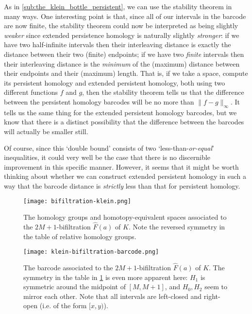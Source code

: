 \documentclass[12pt]{article}
\numberwithin{equation}{subsection}
\numberwithin{theorem}{subsection}
\numberwithin{lemma}{subsection}
\numberwithin{corollary}{subsection}
\numberwithin{definition}{subsection}
\numberwithin{example}{subsection}
\numberwithin{note}{subsection}
\begin{document}
            As in \cref{sub:the_klein_bottle_persistent}, we can use the stability theorem in many ways.
            One interesting point is that, since all of our intervals in the barcode are now finite, the stability theorem could now be interpreted as being slightly \emph{weaker} since extended persistence homology is naturally slightly \emph{stronger}: if we have two half-infinite intervals then their interleaving distance is exactly the distance between their two (finite) endpoints; if we have two \emph{finite} intervals then their interleaving distance is the \emph{minimum} of the (maximum) distance between their endpoints and their (maximum) length.
            That is, if we take a space, compute its persistent homology and extended persistent homology, both using two different functions $f$ and $g$, then the stability theorem tells us that the difference between the persistent homology barcodes will be no more than $\|f-g\|_\infty$.
            It tells us the same thing for the extended persistent homology barcodes, but we know that there is a distinct possibility that the difference between the barcodes will actually be smaller still.

            Of course, since this `double bound' consists of two `less-than-\emph{or-equal}' inequalities, it could very well be the case that there is no discernible improvement in this specific manner.
            However, it seems that it might be worth thinking about whether we can construct extended persistent homology in such a way that the barcode distance is \emph{strictly} less than that for persistent homology.

            \begin{figure}[hpt]
                \centering
                \texttt{[image: bifiltration-klein.png]}
                \caption{The homology groups and homotopy-equivalent spaces associated to the \mbox{$2M+1$}-bifiltration $\widehat{F}(a)$ of $K$. Note the reversed symmetry in the table of relative homology groups.}\label{fg:bifiltration-klein}
            \end{figure}

            \begin{figure}[hpt]
                \centering
                \texttt{[image: klein-bifiltration-barcode.png]}
                \caption{The barcode associated to the \mbox{$2M+1$}-bifiltration $\widehat{F}(a)$ of $K$. The symmetry in the table in \cref{fg:bifiltration-klein} is even more apparent here: $H_1$ is symmetric around the midpoint of $[M,M+1]$, and $H_0,H_2$ seem to mirror each other. Note that all intervals are left-closed and right-open (i.e. of the form $[x,y)$).}\label{fg:klein-bifiltration-barcode}
            \end{figure}
\end{document}
